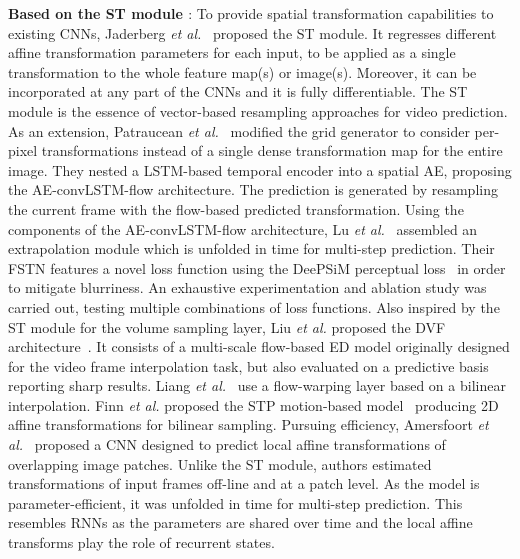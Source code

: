 \vspace*{0.1cm}\noindent\textbf{Based on the \ac{ST} module \cite{Jaderberg2015}}: To provide spatial transformation capabilities to existing \acp{CNN}, Jaderberg \textit{et al.}~\cite{Jaderberg2015} proposed the \ac{ST} module. It regresses different affine transformation parameters for each input, to be applied as a single transformation to the whole feature map(s) or image(s). Moreover, it can be incorporated at any part of the \acp{CNN} and it is fully differentiable. The \ac{ST} module is the essence of vector-based resampling approaches for video prediction. As an extension, Patraucean \textit{et al.}~\cite{Patraucean2015} modified the grid generator to consider per-pixel transformations instead of a single dense transformation map for the entire image. They nested a \ac{LSTM}-based temporal encoder into a spatial \ac{AE}, proposing the AE-convLSTM-flow architecture. The prediction is generated by resampling the current frame with the flow-based predicted transformation. Using the components of the AE-convLSTM-flow architecture, Lu \textit{et al.}~\cite{Lu2017} assembled an extrapolation module which is unfolded in time for multi-step prediction. Their \ac{FSTN} features a novel loss function using the DeePSiM perceptual loss~\cite{Dosovitskiy2016} in order to mitigate blurriness. An exhaustive experimentation and ablation study was carried out, testing multiple combinations of loss functions. Also inspired by the \ac{ST} module for the volume sampling layer, Liu \textit{et al.} proposed the \ac{DVF} architecture~\cite{Liu2017}. It consists of a multi-scale flow-based \ac{ED} model originally designed for the video frame interpolation task, but also evaluated on a predictive basis reporting sharp results. Liang \textit{et al.}~\cite{Liang2017} use a flow-warping layer based on a bilinear interpolation. Finn \textit{et al.} proposed the \ac{STP} motion-based model~\cite{Finn2016} producing 2D affine transformations for bilinear sampling. Pursuing efficiency, Amersfoort \textit{et al.}~\cite{Amersfoort2017} proposed a \ac{CNN} designed to predict local affine transformations of overlapping image patches. Unlike the \ac{ST} module, authors estimated transformations of input frames off-line and at a patch level. As the model is parameter-efficient, it was unfolded in time for multi-step prediction. This resembles \acp{RNN} as the parameters are shared over time and the local affine transforms play the role of recurrent states.

